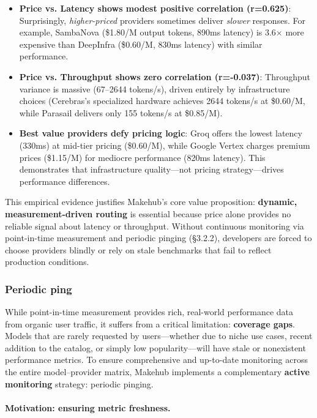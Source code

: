\documentclass[english]{article}
\begin{document}
\begin{itemize}
    \item \textbf{Price vs. Latency shows modest positive correlation (r=0.625)}: Surprisingly, \emph{higher-priced} providers sometimes deliver \emph{slower} responses. For example, SambaNova (\$1.80/M output tokens, 890ms latency) is 3.6× more expensive than DeepInfra (\$0.60/M, 830ms latency) with similar performance.
    \item \textbf{Price vs. Throughput shows zero correlation (r=-0.037)}: Throughput variance is massive (67--2644 tokens/s), driven entirely by infrastructure choices (Cerebras's specialized hardware achieves 2644 tokens/s at \$0.60/M, while Parasail delivers only 155 tokens/s at \$0.85/M).
    \item \textbf{Best value providers defy pricing logic}: Groq offers the lowest latency (330ms) at mid-tier pricing (\$0.60/M), while Google Vertex charges premium prices (\$1.15/M) for mediocre performance (820ms latency). This demonstrates that infrastructure quality—not pricing strategy—drives performance differences.
\end{itemize}

This empirical evidence justifies Makehub's core value proposition: \textbf{dynamic, measurement-driven routing} is essential because price alone provides no reliable signal about latency or throughput. Without continuous monitoring via point-in-time measurement and periodic pinging (§3.2.2), developers are forced to choose providers blindly or rely on stale benchmarks that fail to reflect production conditions.


\subsubsection{Periodic ping}
\label{sec:periodic_ping}

While point-in-time measurement provides rich, real-world performance data from organic user traffic, it suffers from a critical limitation: \textbf{coverage gaps}. Models that are rarely requested by users—whether due to niche use cases, recent addition to the catalog, or simply low popularity—will have stale or nonexistent performance metrics. To ensure comprehensive and up-to-date monitoring across the entire model–provider matrix, Makehub implements a complementary \textbf{active monitoring} strategy: periodic pinging.

\paragraph{Motivation: ensuring metric freshness.}
\end{document}
